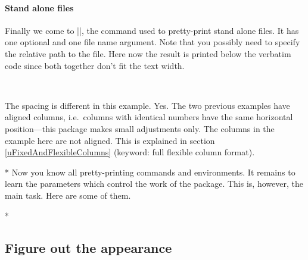 \begin{paracol}{2}
\begin{paracol}{2}
{\paragraph{Stand alone files}
Finally we come to ||, the command used to pretty-print
stand alone files. It has one optional and one file name argument.
Note that you possibly need to specify the relative path to the file.
Here now the result is printed below the verbatim code since both together
don't fit the text width.
\begin{lstsample}{\lstset{comment=[l]\%,columns=fullflexible}}^^A
      {\lstset{alsoletter=\\,emph=\,emphstyle=\rstyle}^^A
      \lstaspectindex{}{}}
   
\end{lstsample}
\begin{advise}
\item The spacing is different in this example.
      \advisespace
      Yes. The two previous examples have aligned columns, i.e.~columns with
      identical numbers have the same horizontal position---this package
      makes small adjustments only. The columns in the example here are not
      aligned. This is explained in section \ref{uFixedAndFlexibleColumns}
      (keyword: full flexible column format).
\end{advise}
\switchcolumn

\switchcolumn[0]*%
Now you know all pretty-printing commands and environments. It remains
to learn the parameters which control the work of the 
package. This is, however, the main task. Here are some of them.
\switchcolumn

\switchcolumn[0]*%
\subsection{Figure out the appearance}\label{gFigureOutTheAppearance}
\switchcolumn

}
\end{paracol}
\end{paracol}
